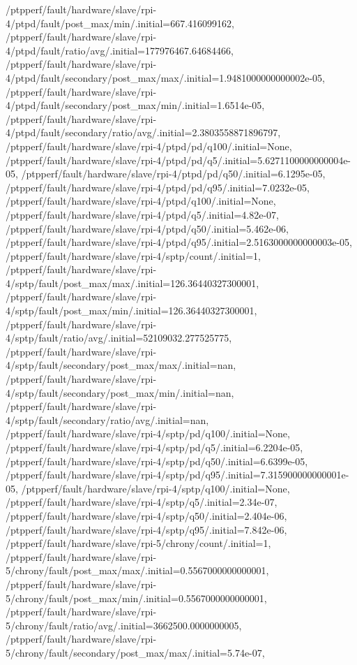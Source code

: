 {    /ptpperf/fault/hardware/slave/rpi-4/ptpd/fault/post_max/min/.initial=667.416099162,
    /ptpperf/fault/hardware/slave/rpi-4/ptpd/fault/ratio/avg/.initial=177976467.64684466,
    /ptpperf/fault/hardware/slave/rpi-4/ptpd/fault/secondary/post_max/max/.initial=1.9481000000000002e-05,
    /ptpperf/fault/hardware/slave/rpi-4/ptpd/fault/secondary/post_max/min/.initial=1.6514e-05,
    /ptpperf/fault/hardware/slave/rpi-4/ptpd/fault/secondary/ratio/avg/.initial=2.3803558871896797,
    /ptpperf/fault/hardware/slave/rpi-4/ptpd/pd/q100/.initial=None,
    /ptpperf/fault/hardware/slave/rpi-4/ptpd/pd/q5/.initial=5.6271100000000004e-05,
    /ptpperf/fault/hardware/slave/rpi-4/ptpd/pd/q50/.initial=6.1295e-05,
    /ptpperf/fault/hardware/slave/rpi-4/ptpd/pd/q95/.initial=7.0232e-05,
    /ptpperf/fault/hardware/slave/rpi-4/ptpd/q100/.initial=None,
    /ptpperf/fault/hardware/slave/rpi-4/ptpd/q5/.initial=4.82e-07,
    /ptpperf/fault/hardware/slave/rpi-4/ptpd/q50/.initial=5.462e-06,
    /ptpperf/fault/hardware/slave/rpi-4/ptpd/q95/.initial=2.5163000000000003e-05,
    /ptpperf/fault/hardware/slave/rpi-4/sptp/count/.initial=1,
    /ptpperf/fault/hardware/slave/rpi-4/sptp/fault/post_max/max/.initial=126.36440327300001,
    /ptpperf/fault/hardware/slave/rpi-4/sptp/fault/post_max/min/.initial=126.36440327300001,
    /ptpperf/fault/hardware/slave/rpi-4/sptp/fault/ratio/avg/.initial=52109032.277525775,
    /ptpperf/fault/hardware/slave/rpi-4/sptp/fault/secondary/post_max/max/.initial=nan,
    /ptpperf/fault/hardware/slave/rpi-4/sptp/fault/secondary/post_max/min/.initial=nan,
    /ptpperf/fault/hardware/slave/rpi-4/sptp/fault/secondary/ratio/avg/.initial=nan,
    /ptpperf/fault/hardware/slave/rpi-4/sptp/pd/q100/.initial=None,
    /ptpperf/fault/hardware/slave/rpi-4/sptp/pd/q5/.initial=6.2204e-05,
    /ptpperf/fault/hardware/slave/rpi-4/sptp/pd/q50/.initial=6.6399e-05,
    /ptpperf/fault/hardware/slave/rpi-4/sptp/pd/q95/.initial=7.315900000000001e-05,
    /ptpperf/fault/hardware/slave/rpi-4/sptp/q100/.initial=None,
    /ptpperf/fault/hardware/slave/rpi-4/sptp/q5/.initial=2.34e-07,
    /ptpperf/fault/hardware/slave/rpi-4/sptp/q50/.initial=2.404e-06,
    /ptpperf/fault/hardware/slave/rpi-4/sptp/q95/.initial=7.842e-06,
    /ptpperf/fault/hardware/slave/rpi-5/chrony/count/.initial=1,
    /ptpperf/fault/hardware/slave/rpi-5/chrony/fault/post_max/max/.initial=0.5567000000000001,
    /ptpperf/fault/hardware/slave/rpi-5/chrony/fault/post_max/min/.initial=0.5567000000000001,
    /ptpperf/fault/hardware/slave/rpi-5/chrony/fault/ratio/avg/.initial=3662500.0000000005,
    /ptpperf/fault/hardware/slave/rpi-5/chrony/fault/secondary/post_max/max/.initial=5.74e-07,
}
